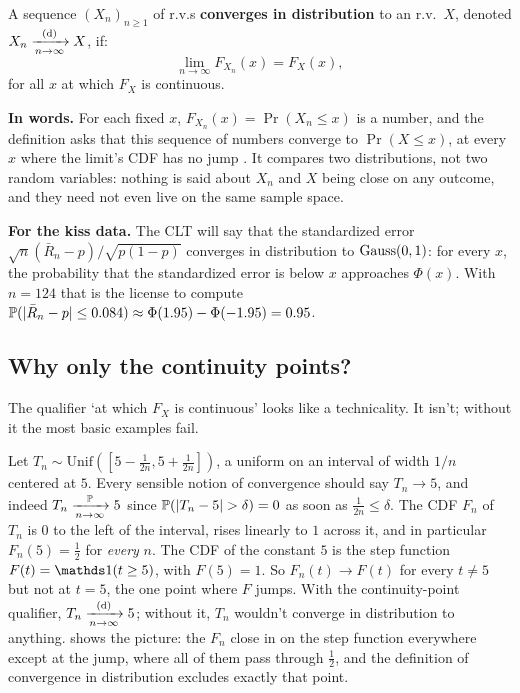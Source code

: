 \begin{definition}
\label{def:convd}
A sequence $(X_n)_{n \geq 1}$ of r.v.s \textbf{converges in distribution} to an r.v.\ $X$, denoted $X_n \xrightarrow [n \to \infty ]{\text{(d)}} X$, if:
\[
\lim_{n \to \infty} F_{X_n}(x) = F_X(x),
\]
for all $x$ at which $F_X$ is continuous.
\end{definition}

\begin{inwords}
\textbf{In words.} For each fixed $x$, $F_{X_n}(x) = \Pr(X_n \leq x)$ is a number, and the definition asks that this sequence of numbers converge to $\Pr(X \leq x)$, at every $x$ where the limit's CDF has no jump . It compares two distributions, not two random variables: nothing is said about $X_n$ and $X$ being close on any outcome, and they need not even live on the same sample space.
\par\smallskip
\textbf{For the kiss data.} The CLT will say that the standardized error $\sqrt{n}(\bar{R}_n - p)/\sqrt{p(1-p)}$ converges in distribution to $\text{Gauss}(0,1)$: for every $x$, the probability that the standardized error is below $x$ approaches $\Phi(x)$. With $n = 124$ that is the license to compute $\mathbb{P}(\lvert\bar{R}_n - p\rvert \leq 0.084) \approx \Phi(1.95) - \Phi(-1.95) = 0.95$.
\end{inwords}

\subsection{Why only the continuity points?}

The qualifier `at which $F_X$ is continuous' looks like a technicality.
It isn't; without it the most basic examples fail.

\begin{example}
\label{ex:unif-shrinking}
Let $T_n \sim \text{Unif}\left(\left[5 - \frac{1}{2n}, 5 + \frac{1}{2n}\right]\right)$, a uniform on an interval of width $1/n$ centered at $5$.
Every sensible notion of convergence should say $T_n \to 5$, and indeed $T_n \xrightarrow [n \to \infty ]{\mathbb{P}} 5$ since $\mathbb{P}(\lvert T_n - 5\rvert > \delta) = 0$ as soon as $\frac{1}{2n} \leq \delta$.
The CDF $F_n$ of $T_n$ is $0$ to the left of the interval, rises linearly to $1$ across it, and in particular $F_n(5) = \frac12$ for \textit{every} $n$.
The CDF of the constant $5$ is the step function $F(t) = \ind(t \geq 5)$, with $F(5) = 1$.
So $F_n(t) \to F(t)$ for every $t \neq 5$ but not at $t = 5$, the one point where $F$ jumps.
With the continuity-point qualifier, $T_n \xrightarrow [n \to \infty ]{\text{(d)}} 5$; without it, $T_n$ wouldn't converge in distribution to anything.
 shows the picture: the $F_n$ close in on the step function everywhere except at the jump, where all of them pass through $\frac12$, and the definition of convergence in distribution excludes exactly that point.
\end{example}

